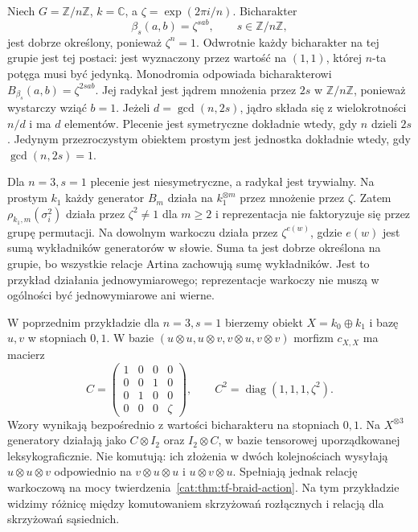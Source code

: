 \begin{przyklad}\label{cat:ex:tf-cyclic-braiding}
Niech $G=\mathbb Z/n\mathbb Z$, $k=\mathbb C$, a $\zeta=\exp(2\pi i/n)$. Bicharakter
\[
 \beta_s(a,b)=\zeta^{sab},\qquad s\in\mathbb Z/n\mathbb Z,
\]
jest dobrze określony, ponieważ $\zeta^n=1$. Odwrotnie każdy bicharakter na tej grupie jest tej postaci: jest wyznaczony przez wartość na $(1,1)$, której $n$-ta potęga musi być jedynką. Monodromia odpowiada bicharakterowi $B_{\beta_s}(a,b)=\zeta^{2sab}$. Jej radykał jest jądrem mnożenia przez $2s$ w $\mathbb Z/n\mathbb Z$, ponieważ wystarczy wziąć $b=1$. Jeżeli $d=\gcd(n,2s)$, jądro składa się z wielokrotności $n/d$ i ma $d$ elementów. Plecenie jest symetryczne dokładnie wtedy, gdy $n$ dzieli $2s$. Jedynym przezroczystym obiektem prostym jest jednostka dokładnie wtedy, gdy $\gcd(n,2s)=1$.

Dla $n=3,s=1$ plecenie jest niesymetryczne, a radykał jest trywialny. Na prostym $k_1$ każdy generator $B_m$ działa na $k_1^{\otimes m}$ przez mnożenie przez $\zeta$. Zatem $\rho_{k_1,m}(\sigma_i^2)$ działa przez $\zeta^2\neq1$ dla $m\geq2$ i reprezentacja nie faktoryzuje się przez grupę permutacji. Na dowolnym warkoczu działa przez $\zeta^{e(w)}$, gdzie $e(w)$ jest sumą wykładników generatorów w słowie. Suma ta jest dobrze określona na grupie, bo wszystkie relacje Artina zachowują sumę wykładników. Jest to przykład działania jednowymiarowego; reprezentacje warkoczy nie muszą w ogólności być jednowymiarowe ani wierne.
\end{przyklad}

\begin{przyklad}\label{cat:ex:tf-braid-matrix}
W poprzednim przykładzie dla $n=3,s=1$ bierzemy obiekt $X=k_0\oplus k_1$ i bazę $u,v$ w stopniach $0,1$. W bazie $(u\otimes u,u\otimes v,v\otimes u,v\otimes v)$ morfizm $c_{X,X}$ ma macierz
\[
 C=\begin{pmatrix}
 1&0&0&0\\
 0&0&1&0\\
 0&1&0&0\\
 0&0&0&\zeta
 \end{pmatrix},
 \qquad C^2=\operatorname{diag}(1,1,1,\zeta^2).
\]
Wzory wynikają bezpośrednio z wartości bicharakteru na stopniach $0,1$. Na $X^{\otimes3}$ generatory działają jako $C\otimes I_2$ oraz $I_2\otimes C$, w bazie tensorowej uporządkowanej leksykograficznie. Nie komutują: ich złożenia w dwóch kolejnościach wysyłają $u\otimes u\otimes v$ odpowiednio na $v\otimes u\otimes u$ i $u\otimes v\otimes u$. Spełniają jednak relację warkoczową na mocy twierdzenia~\ref{cat:thm:tf-braid-action}. Na tym przykładzie widzimy różnicę między komutowaniem skrzyżowań rozłącznych i relacją dla skrzyżowań sąsiednich.
\end{przyklad}


